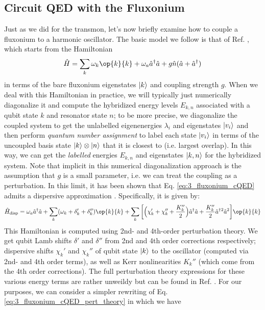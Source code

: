 \subsection{Circuit QED with the Fluxonium\label{sec:3_Circuit_QED_with_Fluxonium}}

Just as we did for the transmon, let's now briefly examine how to couple a fluxonium to a harmonic oscillator. The basic model we follow is that of Ref. \cite{zhu2013cQEDfluxonium}, which starts from the Hamiltonian
\begin{equation}
    \hat{H} = \sum_k \omega_k \op{k}{k} + \omega_a \hat{a}^\dagger\hat{a} + g\hat{n}(\hat{a} + \hat{a}^\dagger)
    \label{eq:3_fluxonium_cQED}
\end{equation}
in terms of the bare fluxonium eigenstates $\lvert k\rangle$ and coupling strength $g$. When we deal with this Hamiltonian in practice, we will typically just numerically diagonalize it and compute the hybridized energy levels $E_{k, n}$ associated with a qubit state $k$ and resonator state $n$; to be more precise, we diagonalize the coupled system to get the unlabelled eigenenergies $\lambda_i$ and eigenstates $\lvert v_i\rangle$ and then perform \textit{quantum number assignment} to label each state $\lvert v_i\rangle$ in terms of the uncoupled basis state $\lvert k\rangle\otimes\lvert n\rangle$ that it is closest to (i.e. largest overlap). In this way, we can get the \textit{labelled} energies $E_{k, n}$ and eigenstates $\lvert k, n\rangle$ for the hybridized system. Note that implicit in this numerical diagonalization approach is the assumption that $g$ is a small parameter, i.e. we can treat the coupling as a perturbation. In this limit, it has been shown that Eq. \eqref{eq:3_fluxonium_cQED} admits a dispersive approximation \cite{zhu2013cQEDfluxonium}. Specifically, it is given by:
\begin{equation}
    \hat{H}_{\rm disp} = \omega_a \hat{a}^\dagger\hat{a} + \sum_k (\omega_k + \delta_k' + \delta_k'') \op{k}{k} + \sum_k \bigg[\Big(\chi_k' + \chi_k'' + \frac{K_k''}{2}\Big)\hat{a}^\dagger\hat{a} + \frac{K_k''}{2}\hat{a}^\dagger{}^2\hat{a}^2\bigg] \op{k}{k}
    \label{eq:3_fluxonium_cQED_pert_theory}
\end{equation}
This Hamiltonian is computed using 2nd- and 4th-order perturbation theory. We get qubit Lamb shifts $\delta'$ and $\delta''$ from 2nd and 4th order corrections respectively; dispersive shifts $\chi_k'$ and $\chi_k''$ of qubit state $\lvert k\rangle$ to the oscillator (computed via 2nd- and 4th order terms), as well as Kerr nonlinearities $K_k''$ (which come from the 4th order corrections). The full perturbation theory expressions for these various energy terms are rather unweildy but can be found in Ref. \cite{zhu2013cQEDfluxonium}. For our purposes, we can consider a simpler rewriting of Eq. \eqref{eq:3_fluxonium_cQED_pert_theory} in which we have
